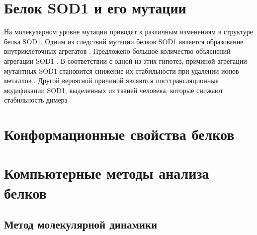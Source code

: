 



\section{Белок SOD1 и его мутации} \label{sect_SOD1}

На молекулярном уровне мутации приводят к различным изменениям в структуре белка SOD1. Одним из следствий мутации белков SOD1 является образование внутриклеточных агрегатов \cite{Bruijn1998,Deng2006}. Предложено большое количество объяснений агрегации SOD1 \cite{Ross2004}. В соответствии с одной из этих гипотез, причиной агрегации мутантных SOD1 становится снижение их стабильности при удалении ионов металлов \cite{Bourassa2014}. Другой вероятной причиной являются посттрансляционные модификации SOD1, выделенных из тканей человека, которые снижают стабильность димера \cite{Dokholyan2015}.

\section{Конформационные свойства белков} \label{sect_proteins_features}

\section{Компьютерные методы анализа белков} \label{sect_computational_methods}

\subsection{Метод молекулярной динамики} \label{sect_methods_MD}

